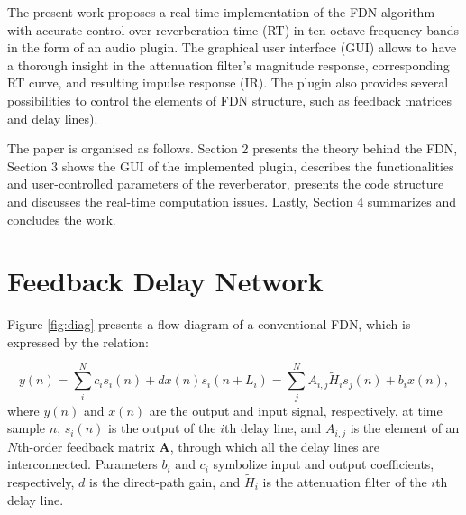 \documentclass[twoside,a4paper]{article}
\newcommand{\silvin}[1]{\textcolor{ForestGreen}{#1}}
\begin{document}




The present work proposes a real-time implementation of the FDN algorithm with accurate control over reverberation time (RT) in ten octave frequency bands in the form of an audio plugin. The graphical user interface (GUI) allows to have a thorough insight in the attenuation filter's magnitude response, corresponding RT curve, and resulting impulse response (IR). The plugin also provides several possibilities to control the elements of FDN structure, such as feedback matrices and delay lines).%

The paper is organised as follows. Section 2 presents the theory behind the FDN, Section 3 shows the GUI of the implemented plugin, describes the functionalities and user-controlled parameters of the reverberator, presents the code structure and discusses the real-time computation issues. Lastly, Section 4 summarizes and concludes the work.




\section{Feedback Delay Network}\label{sec:FDN}
Figure \ref{fig:diag} presents a flow diagram of a conventional FDN, which is expressed by the relation:

\begin{subequations} \label{1}
\begin{equation}\label{1a}
y(n) =  \sum_i^N c_i s_i(n) + d x(n) 
\end{equation}
\begin{equation}\label{1b}
s_i(n + L_i) = \sum_j^N A_{i,j} \widetilde{H}_{i} s_j(n) + b_i x(n),
\end{equation}
\end{subequations}
%
where $y(n)$ and $x(n)$ are the output and input signal, respectively, at time sample $n$, $s_i(n)$ is the output of the $i$th delay line, and $A_{i,j}$ is the element of an $N$th-order feedback matrix $\textbf{A}$, through which all the delay lines are interconnected. Parameters $b_i$ and $c_i$ symbolize input and output coefficients, respectively, $d$ is the direct-path gain, and $\widetilde{H}_{i}$ is the attenuation filter of the $i$th delay line.
\end{document}
